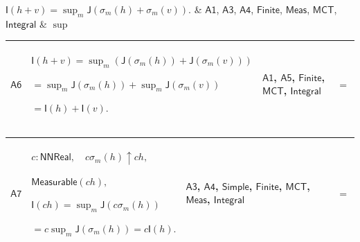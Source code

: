 \documentclass[11pt]{amsart}
\newlength{\FTCFourColumnBody}
\begin{document}
{\begin{tabular}
$\displaystyle \textsf{I}(h+v)=\sup_m\textsf{J}(\sigma_m(h)+\sigma_m(v)).$ & \hyperlink{dct:A1}{$\displaystyle \textsf{A1}$}, \hyperlink{dct:A3}{$\displaystyle \textsf{A3}$}, \hyperlink{dct:A4}{$\displaystyle \textsf{A4}$}, \hyperlink{lem:Finite}{$\displaystyle \textsf{Finite}$}, \hyperlink{lem:Meas}{$\displaystyle \textsf{Meas}$}, \hyperlink{lem:MCT}{$\displaystyle \textsf{MCT}$}, \hyperlink{lem:Integral}{$\displaystyle \textsf{Integral}$} & $\displaystyle \sup$\\ \hline
\end{tabular}%
\par\setlength{\parskip}{0pt}\nointerlineskip
\noindent
\begin{tabular}{|@{}>{\centering\arraybackslash}m{0.078431\FTCFourColumnBody}|>{\centering\arraybackslash}m{0.535947\FTCFourColumnBody}|>{\centering\arraybackslash}m{0.281045\FTCFourColumnBody}|>{\centering\arraybackslash}m{0.104575\FTCFourColumnBody}|}\hline
\hypertarget{dct:A6}{$\displaystyle \textsf{A6}$} & $\displaystyle \textsf{I}(h+v)=\sup_m(\textsf{J}(\sigma_m(h))+\textsf{J}(\sigma_m(v)))$\par
$\displaystyle {}=\sup_m\textsf{J}(\sigma_m(h))+\sup_m\textsf{J}(\sigma_m(v))$\par
$\displaystyle {}=\textsf{I}(h)+\textsf{I}(v).$ & \hyperlink{dct:A1}{$\displaystyle \textsf{A1}$}, \hyperlink{dct:A5}{$\displaystyle \textsf{A5}$}, \hyperlink{lem:Finite}{$\displaystyle \textsf{Finite}$}, \hyperlink{lem:MCT}{$\displaystyle \textsf{MCT}$}, \hyperlink{lem:Integral}{$\displaystyle \textsf{Integral}$} & $\displaystyle =$\\ \hline
\end{tabular}%
\par\setlength{\parskip}{0pt}\nointerlineskip
\noindent
\begin{tabular}{|@{}>{\centering\arraybackslash}m{0.078431\FTCFourColumnBody}|>{\centering\arraybackslash}m{0.535947\FTCFourColumnBody}|>{\centering\arraybackslash}m{0.281045\FTCFourColumnBody}|>{\centering\arraybackslash}m{0.104575\FTCFourColumnBody}|}\hline
\hypertarget{dct:A7}{$\displaystyle \textsf{A7}$} & $\displaystyle c:\textsf{NNReal},\quad c\sigma_m(h)\uparrow ch,$\par
$\displaystyle \textsf{Measurable}(ch),$\par
$\displaystyle \textsf{I}(ch)=\sup_m\textsf{J}(c\sigma_m(h))$\par
$\displaystyle {}=c\sup_m\textsf{J}(\sigma_m(h))=c\textsf{I}(h).$ & \hyperlink{dct:A3}{$\displaystyle \textsf{A3}$}, \hyperlink{dct:A4}{$\displaystyle \textsf{A4}$}, \hyperlink{lem:Simple}{$\displaystyle \textsf{Simple}$}, \hyperlink{lem:Finite}{$\displaystyle \textsf{Finite}$}, \hyperlink{lem:MCT}{$\displaystyle \textsf{MCT}$}, \hyperlink{lem:Meas}{$\displaystyle \textsf{Meas}$}, \hyperlink{lem:Integral}{$\displaystyle \textsf{Integral}$} & $\displaystyle =$\\ \hline

\end{tabular}}
\end{document}
